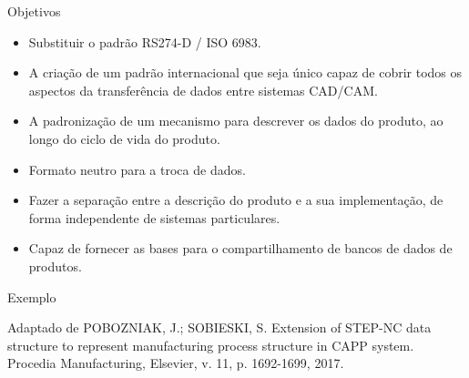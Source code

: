 \documentclass[aspectratio=169]{beamer}
\begin{document}
{%

\begin{frame}{Objetivos}
  \begin{itemize}
    \item {
      Substituir o padrão RS274-D / ISO 6983.
    }
    \item{
      A criação de um padrão internacional que seja único capaz de cobrir todos os aspectos 
      da transferência de dados entre sistemas CAD/CAM.
    }
    \item {
      A padronização de um mecanismo para descrever os dados do produto, ao longo do ciclo de 
      vida do produto.
    }
    \item {
      Formato neutro para a troca de dados.
    }
    \item {
      Fazer a separação entre a descrição do produto e a sua implementação, 
      de forma independente de sistemas particulares.
    }
    \item {
      Capaz de fornecer as bases para o compartilhamento de bancos de dados de produtos.
    }
  \end{itemize}
\end{frame}



\begin{frame}{Exemplo}

  Adaptado de POBOZNIAK, J.; SOBIESKI, S. Extension of STEP-NC data structure to represent
  manufacturing process structure in CAPP system. Procedia Manufacturing, Elsevier,
  v. 11, p. 1692-1699, 2017.


\end{frame}}
\end{document}
